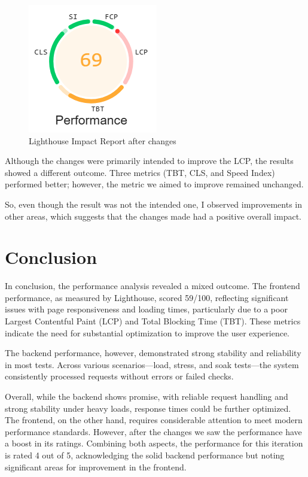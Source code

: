 \documentclass[a4paper,11pt,openright,BCOR=15mm]{scrbook}
\begin{document}
\begin{figure}[H]
	\centering
	\includegraphics[width=.7\textwidth]{figs/Performance/Frontend/LighthouseImpact after changes.png}
	\caption{Lighthouse Impact Report after changes}
	\label{fig:LighthouseImpactAC}
\end{figure}

Although the changes were primarily intended to improve the LCP, the results showed a different outcome. Three metrics (TBT, CLS, and Speed Index) performed better; however, the metric we aimed to improve remained unchanged.

So, even though the result was not the intended one, I observed improvements in other areas, which suggests that the changes made had a positive overall impact.

\section{Conclusion}
In conclusion, the performance analysis revealed a mixed outcome. The frontend performance, as measured by Lighthouse, scored 59/100, reflecting significant issues with page responsiveness and loading times, particularly due to a poor Largest Contentful Paint (LCP) and Total Blocking Time (TBT). These metrics indicate the need for substantial optimization to improve the user experience.


The backend performance, however, demonstrated strong stability and reliability in most tests. Across various scenarios—load, stress, and soak tests—the system consistently processed requests without errors or failed checks.


Overall, while the backend shows promise, with reliable request handling and strong stability under heavy loads, response times could be further optimized. The frontend, on the other hand, requires considerable attention to meet modern performance standards. However, after the changes we saw the performance have a boost in its ratings. Combining both aspects, the performance for this iteration is rated 4 out of 5, acknowledging the solid backend performance but noting significant areas for improvement in the frontend.
\end{document}
